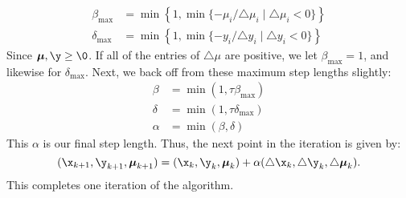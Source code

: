 \begin{align*}
\beta_{\max} &= \min\left\{1, \min\{-\mu_i/\triangle \mu_i \mid \triangle \mu_i < 0 \}\right\}\\
\delta_{\max} &= \min\left\{1, \min\{-y_i/\triangle y_i \mid \triangle y_i < 0 \}\right\}
\end{align*}
Since $\Mu,\y \geq \0$.
If all of the entries of $\triangle \mu$ are positive, we let $\beta_{\max} = 1$, and likewise for $\delta_{\max}$.
Next, we back off from these maximum step lengths slightly:
\begin{align*}
\beta &= \min(1, \tau\beta_{\max})\\
\delta &= \min(1, \tau\delta_{\max})\\
\alpha &= \min(\beta, \delta)
\end{align*}
This $\alpha$ is our final step length.
Thus, the next point in the iteration is given by:
\[
(\x_{k+1}, \y_{k+1}, \Mu_{k+1}) = (\x_k, \y_k, \Mu_k) + \alpha(\triangle \x_k, \triangle \y_k, \triangle \Mu_k).
\]
This completes one iteration of the algorithm.

\begin{comment} %
We summarize the entire procedure in Algorithm \ref{alg:predcorr}.
\begin{algorithm}
\begin{algorithmic}[1]
\Procedure{Predictor-Corrector Algorithm for QP}{}
    \State \textrm{Choose initial point } $(x_0, y_0, \lambda_0)$.
    \For{$k = 0, 1, 2, \ldots$}
        \State \textrm{Solve \ref{eq:affine} for } $(\triangle x, \triangle y, \triangle \lambda)$.
        \State \textrm{Calculate } $\nu, \hat{\alpha}, \hat{\nu},$\textrm{and} $\sigma$.
        \State \textrm{Solve \ref{eq:perturbed} for } $(\triangle x', \triangle y',\triangle \lambda')$.
        \State \textrm{Calculate the step length } $\alpha$.
        \State $(x_{k+1}, y_{k+1}, \lambda_{k+1}) = (x_k, y_k, \lambda_k) + \alpha(\triangle x', \triangle y', \triangle \lambda').$
    \EndFor
\EndProcedure
\end{algorithmic}
\caption{Predictor-Corrector Algorithm}
\label{alg:predcorr}
\end{algorithm}

\begin{info} %
As with our Interior Point method for linear constrained optimization, the most expensive part of each iteration is solving the linear systems \ref{eq:affine} and \ref{eq:perturbed}.
Note, however, that these systems both have the same matrix on the left-hand side.
This allows us to factor the matrix just once per iteration, and use the factorization to solve both systems.
A more sophisticated implementation would likely split up these large systems of equations into a few smaller ones, and then use Cholesky-based factorizations.
To simplify matters, we suggest simply using as a first attempt an LU decomposition on the entire matrix.
\end{info}
\end{comment} %

